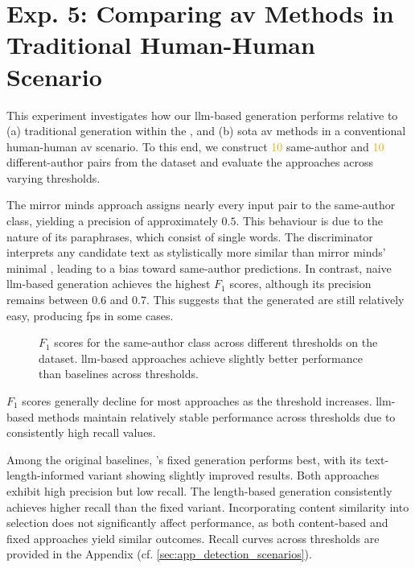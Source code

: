 \section{Exp. 5: Comparing \acs{av} Methods in Traditional Human-Human Scenario}
\label{sec:results_trad_av}


This experiment investigates how our \ac{llm}-based \imp{} generation performs relative to (a) traditional \imp{} generation within the \impAppr{}, and (b) \acl{sota} \ac{av} methods in a conventional human-human \ac{av} scenario. 
To this end, we construct \textcolor{orange}{10} same-author and \textcolor{orange}{10} different-author pairs from the \dataStudent{} dataset and evaluate the approaches across varying thresholds.

The mirror minds approach assigns nearly every input pair to the same-author class, yielding a precision of approximately $0.5$. 
This behaviour is due to the nature of its paraphrases, which consist of single words. 
The discriminator interprets any candidate text as stylistically more similar than mirror minds' minimal \imps{}, leading to a bias toward same-author predictions. 
In contrast, naive \ac{llm}-based \imp{} generation achieves the highest $F_1$ scores, although its precision remains between $0.6$ and $0.7$. 
This suggests that the generated \imps{} are still relatively easy, producing \acp{fp} in some cases.

\begin{figure}[h]
\centering
    
  \caption{$F_1$ scores for the same-author class across different thresholds on the \dataStudent{} dataset. 
\ac{llm}-based approaches achieve slightly better performance than baselines across thresholds.}
  \label{fig:human-human_f1}
\end{figure}

$F_1$ scores generally decline for most approaches as the threshold increases. 
\ac{llm}-based methods maintain relatively stable performance across thresholds due to consistently high recall values. 

Among the original baselines, \citet{koppel_determining_2014}'s fixed \imp{} generation performs best, with its text-length-informed variant showing slightly improved results. 
Both approaches exhibit high precision but low recall. 
The length-based \imp{} generation consistently achieves higher recall than the fixed variant. 
Incorporating content similarity into \imp{} selection does not significantly affect performance, as both content-based and fixed \imp{} approaches yield similar outcomes. 
Recall curves across thresholds are provided in the Appendix (cf. \autoref{sec:app_detection_scenarios}).
